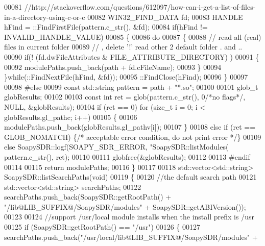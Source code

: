 \begin{DoxyCode}
00081     \textcolor{comment}{//http://stackoverflow.com/questions/612097/how-can-i-get-a-list-of-files-in-a-directory-using-c-or-c}
00082     WIN32\_FIND\_DATA fd; 
00083     HANDLE hFind = ::FindFirstFile(pattern.c\_str(), &fd); 
00084     \textcolor{keywordflow}{if}(hFind != INVALID\_HANDLE\_VALUE) 
00085     \{ 
00086         \textcolor{keywordflow}{do} 
00087         \{ 
00088             \textcolor{comment}{// read all (real) files in current folder}
00089             \textcolor{comment}{// , delete '!' read other 2 default folder . and ..}
00090             \textcolor{keywordflow}{if}(! (fd.dwFileAttributes & FILE\_ATTRIBUTE\_DIRECTORY) ) 
00091             \{
00092                 modulePaths.push\_back(path + fd.cFileName);
00093             \}
00094         \}\textcolor{keywordflow}{while}(::FindNextFile(hFind, &fd)); 
00095         ::FindClose(hFind); 
00096     \}
00097 
00098 \textcolor{preprocessor}{#else}
00099     \textcolor{keyword}{const} std::string pattern = path + \textcolor{stringliteral}{"*.so"};
00100 
00101     glob\_t globResults;
00102 
00103     \textcolor{keyword}{const} \textcolor{keywordtype}{int} ret = glob(pattern.c\_str(), 0\textcolor{comment}{/*no flags*/}, NULL, &globResults);
00104     \textcolor{keywordflow}{if} (ret == 0) \textcolor{keywordflow}{for} (\textcolor{keywordtype}{size\_t} i = 0; i < globResults.gl\_pathc; i++)
00105     \{
00106         modulePaths.push\_back(globResults.gl\_pathv[i]);
00107     \}
00108     \textcolor{keywordflow}{else} \textcolor{keywordflow}{if} (ret == GLOB\_NOMATCH) \{\textcolor{comment}{/* acceptable error condition, do not print error */}\}
00109     \textcolor{keywordflow}{else} SoapySDR::logf(SOAPY_SDR_ERROR, \textcolor{stringliteral}{"SoapySDR::listModules(%
      pattern.c\_str(), ret);
00110 
00111     globfree(&globResults);
00112 
00113 \textcolor{preprocessor}{#endif}
00114 
00115     \textcolor{keywordflow}{return} modulePaths;
00116 \}
00117 
00118 std::vector<std::string> SoapySDR::listSearchPaths(\textcolor{keywordtype}{void})
00119 \{
00120     \textcolor{comment}{//the default search path}
00121     std::vector<std::string> searchPaths;
00122     searchPaths.push\_back(SoapySDR::getRootPath() + \textcolor{stringliteral}{"/lib@LIB\_SUFFIX@/SoapySDR/modules"} + 
      SoapySDR::getABIVersion());
00123 
00124     \textcolor{comment}{//support /usr/local module installs when the install prefix is /usr}
00125     \textcolor{keywordflow}{if} (SoapySDR::getRootPath() == \textcolor{stringliteral}{"/usr"})
00126     \{
00127         searchPaths.push\_back(\textcolor{stringliteral}{"/usr/local/lib@LIB\_SUFFIX@/SoapySDR/modules"} + 
}
\end{DoxyCode}
